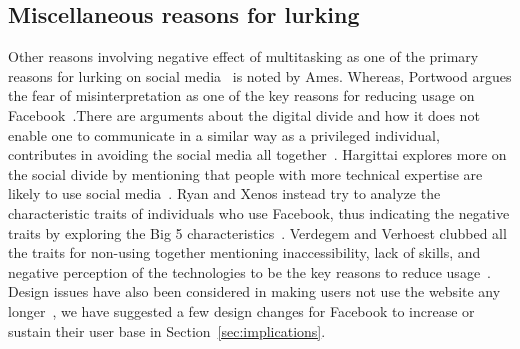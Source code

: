 \subsection{Miscellaneous reasons for lurking}
Other reasons involving negative effect of multitasking as one of the primary reasons for lurking on social media~\cite{ames2013managing} is noted by Ames. Whereas, Portwood argues the fear of misinterpretation as one of the key reasons for reducing usage on Facebook~\cite{portwood2013media}.There are arguments about the digital divide and how it does not enable one to communicate in a similar way as a privileged individual, contributes in avoiding the social media all together~\cite{van2005deepening,warschauer2004technology}. Hargittai explores more on the social divide by mentioning that people with more technical expertise are likely to use social media~\cite{hargittai2007whose}. Ryan and Xenos instead try to analyze the characteristic traits of individuals who use Facebook, thus indicating the negative traits by exploring the Big 5 characteristics~\cite{ryan2011uses}. Verdegem and Verhoest clubbed all the traits for non-using together mentioning inaccessibility, lack of skills, and negative perception of the technologies to be the key reasons to reduce usage~\cite{verdegem2009profiling}. Design issues have also been considered in making users not use the website any longer~\cite{pierce2012undesigning,satchell2009beyond}, we have suggested a few design changes for Facebook to increase or sustain their user base in Section~\ref{sec:implications}.

 
